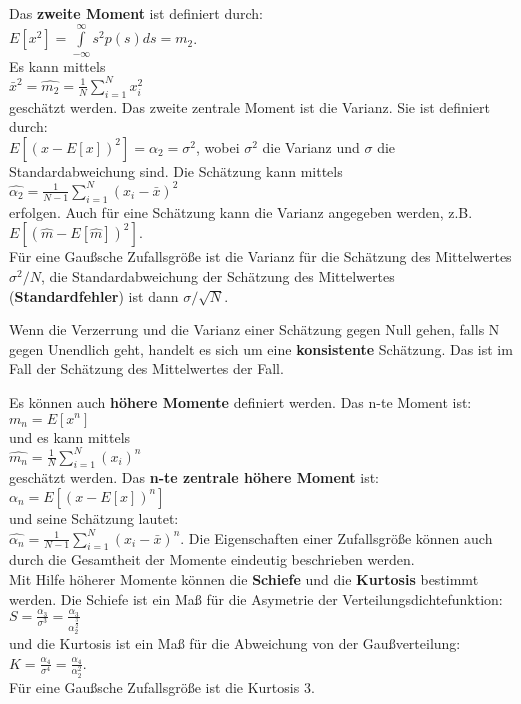 Das {\bf zweite Moment} ist definiert durch:\\
$E[x^2]= \int\limits_{-\infty}^{\infty} s^2 p(s) ds=m_2$.\\
Es kann mittels\\
 $\bar x^2=\hat{m_2}=\frac{1}{N}\sum\limits_{i=1}^N x_i^2$\\
geschätzt werden. Das zweite zentrale Moment ist die Varianz. Sie ist definiert durch:\\
 $E[(x-E[x])^2]=\alpha_2=\sigma^2$, wobei $\sigma^2$ die Varianz und $\sigma$ die Standardabweichung sind. Die Schätzung kann mittels\\
$\hat{\alpha_2}=\frac{1}{N-1}\sum \limits_{i=1}^N (x_i - \bar x)^2 $\\
erfolgen. Auch für eine Schätzung kann die Varianz angegeben werden, z.B.\\
 $E[(\hat{m}-E[\hat{m}])^2].$\\
Für eine Gaußsche Zufallsgröße ist die Varianz für die Schätzung des Mittelwertes $\sigma^2/N$, die Standardabweichung der Schätzung des Mittelwertes ({\bf Standardfehler}) ist dann $\sigma/\sqrt{N}$. 

Wenn die Verzerrung und die Varianz einer Schätzung gegen Null gehen, falls N gegen Unendlich geht, handelt es sich um eine {\bf konsistente} Schätzung. Das ist im Fall der Schätzung des Mittelwertes der Fall.

Es können auch {\bf höhere Momente} definiert werden. Das n-te Moment ist:\\
$m_n=E[x^n]$\\
und es kann mittels\\
 $\hat{m_n}=\frac {1}{N} \sum\limits_{i=1}^N (x_i)^n$\\
geschätzt werden. 
Das {\bf n-te zentrale höhere Moment} ist:\\
 $\alpha _n=E[(x-E[x])^n]$\\
und seine Schätzung lautet:\\
 $\hat{\alpha_n}=\frac {1}{N-1} \sum\limits_{i=1}^N (x_i - \bar x)^n$. Die Eigenschaften einer Zufallsgröße können auch durch die Gesamtheit der Momente eindeutig beschrieben werden. \\
Mit Hilfe höherer Momente können die {\bf Schiefe} und die {\bf Kurtosis} bestimmt werden. Die Schiefe ist ein Maß für die Asymetrie der Verteilungsdichtefunktion:\\
$S=\frac {\alpha_3}{\sigma^3}=\frac {\alpha_3}{\alpha_2^{\frac{3}{2}}}$\\
und die Kurtosis ist ein Maß für die Abweichung von der Gaußverteilung:\\
$K=\frac {\alpha_4}{\sigma^4}=\frac {\alpha_4}{\alpha_2^2}$.\\
Für eine Gaußsche Zufallsgröße ist die Kurtosis 3.

